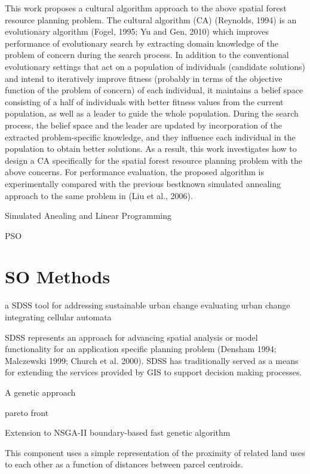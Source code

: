 \documentclass[12pt]{caltech_thesis}
\begin{document}
\begin{bibunit}
This work proposes a cultural algorithm approach to the above
spatial forest resource planning problem. The cultural algorithm
(CA) (Reynolds, 1994) is an evolutionary algorithm (Fogel, 1995; Yu
and Gen, 2010) which improves performance of evolutionary
search by extracting domain knowledge of the problem of concern
during the search process. In addition to the conventional evolutionary
settings that act on a population of individuals (candidate
solutions) and intend to iteratively improve fitness (probably in
terms of the objective function of the problem of concern) of each
individual, it maintains a belief space consisting of a half of individuals
with better fitness values from the current population,
as well as a leader to guide the whole population. During the
search process, the belief space and the leader are updated by
incorporation of the extracted problem-specific knowledge, and
they influence each individual in the population to obtain better
solutions. As a result, this work investigates how to design a CA
specifically for the spatial forest resource planning problem with
the above concerns. For performance evaluation, the proposed
algorithm is experimentally compared with the previous bestknown
simulated annealing approach to the same problem in
(Liu et al., 2006).


Simulated Anealing and Linear Programming \citep{tarp1997spatial}

PSO \citep{ma2011land}

\section{SO Methods}

\citep{ward2003integrating} 
a SDSS tool for addressing sustainable urban change
evaluating urban change integrating cellular automata

SDSS represents an approach for advancing spatial analysis or model functionality for an application specific planning problem (Densham 1994; Malczewski 1999; Church et al. 2000). SDSS has traditionally served as a means for extending the services provided by GIS to support decision making processes.

\citep{stewart2004genetic} A genetic approach

\citep{huang2008seeking} pareto front

\citep{Cao2011} Extension to NSGA-II
\citep{cao2012sustainable} boundary-based fast genetic algorithm

\citep{stewart2014multiobjective}This component uses a simple representation of the proximity of related land uses to each other as a function of distances between parcel centroids.


\end{bibunit}
\end{document}
